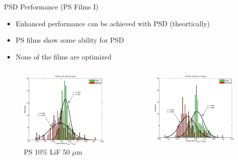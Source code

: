 \begin{frame}{PSD Performance (PS Films I)}
\small
\begin{itemize}
	\item Enhanced performance can be achieved with PSD (theortically)
	\item PS films show some ability for PSD
	\item None of the films are optimized \cite{zaitseva_plastic_2012}
\end{itemize}
\begin{columns}[onlytextwidth]
\begin{column}{0.30\textwidth}
	\tiny
	\begin{figure}
		\centering
		\includegraphics[width=\textwidth]{images/ChargeIntegration_PS_LiF_POP_50um.eps}
		\caption{PS 10\% LiF 50 $\mu$m}
	\end{figure}
\end{column}
\begin{column}{0.30\textwidth}
	\tiny
	\begin{figure}
		\centering
		\includegraphics[width=\textwidth]{images/ChargeIntegration_PS_LiF_POP_151um.eps}

\end{figure}
\end{column}
\end{columns}
\end{frame}
